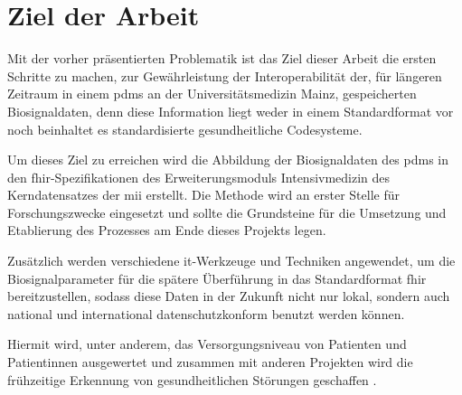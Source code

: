 \section{Ziel der Arbeit} \label{sec:goal}

Mit der vorher präsentierten Problematik ist das Ziel dieser Arbeit die ersten Schritte zu machen, zur Gewährleistung der Interoperabilität der, für längeren Zeitraum in einem \ac{pdms} an der Universitätsmedizin Mainz, gespeicherten Biosignaldaten, denn diese Information liegt weder in einem Standardformat vor noch beinhaltet es standardisierte gesundheitliche Codesysteme. 

Um dieses Ziel zu erreichen wird die Abbildung der Biosignaldaten des \ac{pdms} in den \ac{fhir}-Spezifikationen des Erweiterungsmoduls \glqq Intensivmedizin\grqq{} des Kerndatensatzes der \ac{mii} erstellt. Die Methode wird an erster Stelle für Forschungszwecke eingesetzt und sollte die Grundsteine für die Umsetzung und Etablierung des Prozesses am Ende dieses Projekts legen. 

Zusätzlich werden verschiedene \ac{it}-Werkzeuge und Techniken angewendet, um die Biosignalparameter für die spätere Überführung in das Standardformat \ac{fhir} bereitzustellen, sodass diese Daten in der Zukunft nicht nur lokal, sondern auch national und international datenschutzkonform benutzt werden können. 

Hiermit wird, unter anderem, das Versorgungsniveau von Patienten und Patientinnen ausgewertet und zusammen mit anderen Projekten wird die frühzeitige Erkennung von gesundheitlichen Störungen geschaffen \cite{icukdz}.